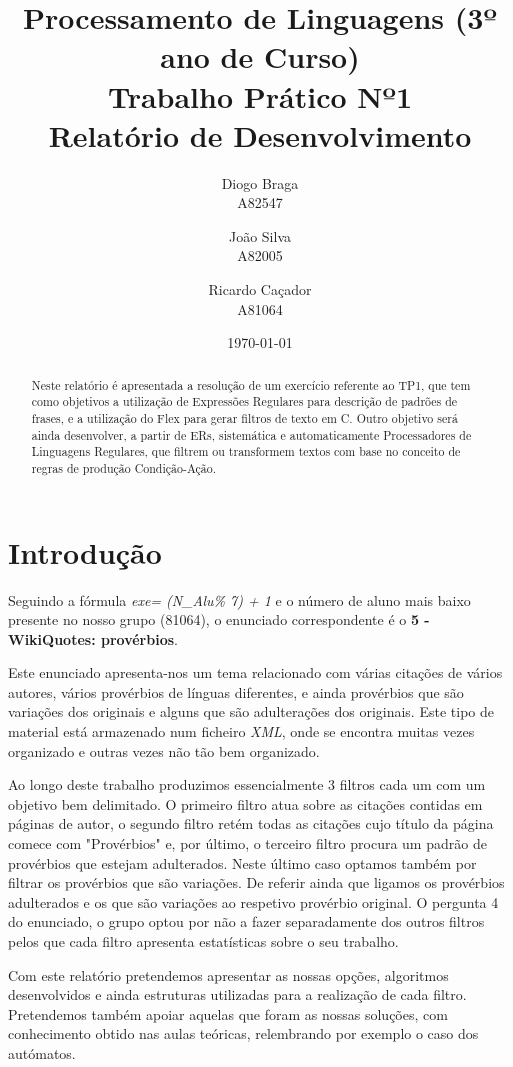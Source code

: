 \documentclass[11pt,a4paper]{report}
\title{Processamento de Linguagens (3º ano de Curso)\\
	\textbf{Trabalho Prático Nº1}\\ Relatório de Desenvolvimento}
\author{Diogo Braga\\ A82547 \and João Silva\\ A82005 \and Ricardo Caçador\\ A81064}
\date{\today}
\begin{document}
\maketitle

\begin{abstract}
	Neste relatório é apresentada a resolução de um exercício referente ao TP1, que tem como objetivos a utilização de Expressões Regulares para descrição de padrões de frases, e a utilização do Flex para gerar filtros de texto em C.
Outro objetivo será ainda desenvolver, a partir de ERs, sistemática e automaticamente Processadores de Linguagens Regulares, que filtrem ou transformem textos com base no conceito de regras de produção Condição-Ação.
\end{abstract}

\tableofcontents

\newpage

\chapter{Introdução}
\label{chap:intro}

Seguindo a fórmula \emph{exe= (N\_Alu\% 7) + 1} e o número de aluno mais baixo presente no nosso grupo (81064), o enunciado correspondente é o \textbf{5 - WikiQuotes: provérbios}.

Este enunciado apresenta-nos um tema relacionado com várias citações de vários autores, vários provérbios de línguas diferentes, e ainda provérbios que são variações dos originais e alguns que são adulterações dos originais. Este tipo de material está armazenado num ficheiro \emph{XML}, onde se encontra muitas vezes organizado e outras vezes não tão bem organizado.

Ao longo deste trabalho produzimos essencialmente 3 filtros cada um com um objetivo bem delimitado. O primeiro filtro atua sobre as citações contidas em páginas de autor, o segundo filtro retém todas as citações cujo título da página comece com "Provérbios" e, por último, o terceiro filtro procura um padrão de provérbios que estejam adulterados. Neste último caso optamos também por filtrar os provérbios que são variações. De referir ainda que ligamos os provérbios adulterados e os que são variações ao respetivo provérbio original. O pergunta 4 do enunciado, o grupo optou por não a fazer separadamente dos outros filtros pelos que cada filtro apresenta estatísticas sobre o seu trabalho.

Com este relatório pretendemos apresentar as nossas opções, algoritmos desenvolvidos e ainda estruturas utilizadas para a realização de cada filtro. Pretendemos também apoiar aquelas que foram as nossas soluções, com conhecimento obtido nas aulas teóricas, relembrando por exemplo o caso dos autómatos.
\end{document}
